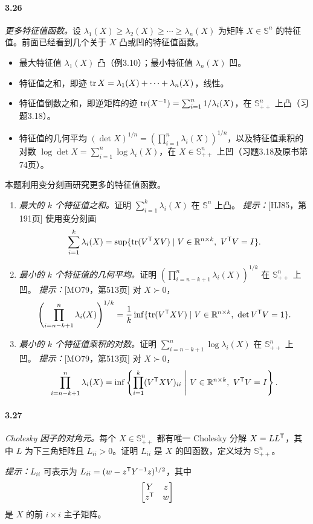 \paragraph{3.26}\textit{更多特征值函数。}设 $\lambda_1(X)\geq\lambda_2(X)\geq\cdots\geq\lambda_n(X)$ 为矩阵 $X\in\mathbb S^n$ 的特征值。前面已经看到几个关于 $X$ 凸或凹的特征值函数。
\begin{itemize}
\item 最大特征值 $\lambda_1(X)$ 凸（例3.10）；最小特征值 $\lambda_n(X)$ 凹。
\item 特征值之和，即迹 $\operatorname{tr} X=\lambda_1(X)+\cdots+\lambda_n(X)$，线性。
\item 特征值倒数之和，即逆矩阵的迹 $\operatorname{tr}(X^{-1})=\sum_{i=1}^n1/\lambda_i(X)$，在 $\mathbb S_{++}^n$ 上凸（习题3.18）。
\item 特征值的几何平均 $(\det X)^{1/n}=(\prod_{i=1}^n\lambda_i(X))^{1/n}$，以及特征值乘积的对数 $\log\det X=\sum_{i=1}^n\log\lambda_i(X)$，在 $X\in\mathbb S_{++}^n$ 上凹（习题3.18及原书第74页）。
\end{itemize}
本题利用变分刻画研究更多的特征值函数。
\begin{enumerate}[label=(\alph*)]
\item \textit{最大的 $k$ 个特征值之和。}证明 $\sum_{i=1}^k\lambda_i(X)$ 在 $\mathbb S^n$ 上凸。
\textit{提示：}[HJ85，第191页] 使用变分刻画
\[\sum_{i=1}^k\lambda_i(X)=\sup\{\operatorname{tr}(V^\mathsf T XV)\mid V\in\mathbb R^{n\times k},\ V^\mathsf T V=I\}.\]
\item \textit{最小的 $k$ 个特征值的几何平均。}证明 $(\prod_{i=n-k+1}^n\lambda_i(X))^{1/k}$ 在 $\mathbb S_{++}^n$ 上凹。
\textit{提示：}[MO79，第513页] 对 $X\succ0$，
\[\left(\prod_{i=n-k+1}^n\lambda_i(X)\right)^{1/k}
 =\frac1k\inf\{\operatorname{tr}(V^\mathsf T XV)\mid V\in\mathbb R^{n\times k},\ \det V^\mathsf T V=1\}.\]
\item \textit{最小的 $k$ 个特征值乘积的对数。}证明 $\sum_{i=n-k+1}^n\log\lambda_i(X)$ 在 $\mathbb S_{++}^n$ 上凹。
\textit{提示：}[MO79，第513页] 对 $X\succ0$，
\[\prod_{i=n-k+1}^n\lambda_i(X)
 =\inf\left\{\prod_{i=1}^k(V^\T XV)_{ii}\ \middle|\ V\in\R^{n\times k},\ V^\T V=I\right\}.\]
\end{enumerate}
\paragraph{3.27}\textit{Cholesky 因子的对角元。}每个 $X\in\mathbb S_{++}^n$ 都有唯一 Cholesky 分解 $X=LL^\mathsf T$，其中 $L$ 为下三角矩阵且 $L_{ii}>0$。证明 $L_{ii}$ 是 $X$ 的凹函数，定义域为 $\mathbb S_{++}^n$。

\textit{提示：}$L_{ii}$ 可表示为 $L_{ii}=(w-z^\mathsf T Y^{-1}z)^{1/2}$，其中
\[\begin{bmatrix}Y&z\\z^\mathsf T&w\end{bmatrix}\]
是 $X$ 的前 $i\times i$ 主子矩阵。
